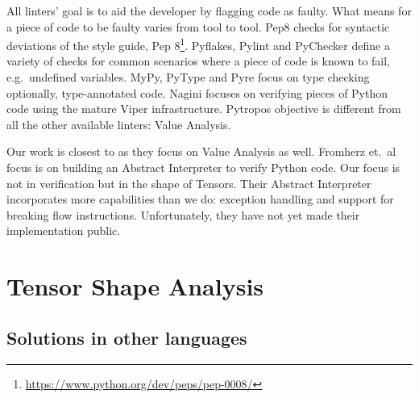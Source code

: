 All linters' goal is to aid the developer by flagging code as faulty. What means for a
piece of code to be faulty varies from tool to tool. Pep8 checks for syntactic deviations
of the style guide, Pep 8\footnote{\url{https://www.python.org/dev/peps/pep-0008/}}.
Pyflakes, Pylint and PyChecker define a variety of checks for common scenarios where a
piece of code is known to fail, e.g.~undefined variables. MyPy, PyType and Pyre focus on
type checking optionally, type-annotated code. Nagini focuses on verifying pieces of Python
code using the mature Viper \autocite{muller_viper_2016} infrastructure. Pytropos
objective is different from all the other available linters: Value Analysis.

Our work is closest to \textcite{fromherz_static_2018} as they focus on Value Analysis as
well. Fromherz et.~al focus is on building an Abstract Interpreter to verify Python code.
Our focus is not in verification but in the shape of Tensors. Their Abstract Interpreter
incorporates more capabilities than we do: exception handling and support for breaking
flow instructions. Unfortunately, they have not yet made their implementation public.

\section{Tensor Shape Analysis}

%

\subsection{Solutions in other languages}

